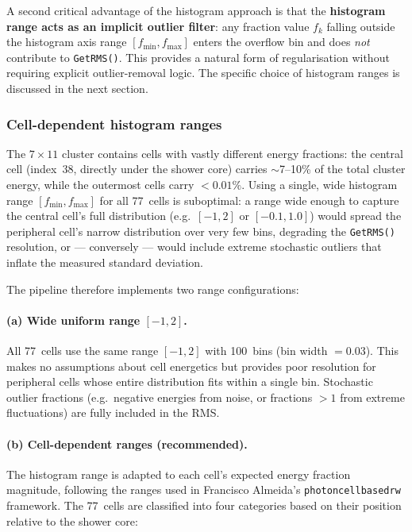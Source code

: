 \documentclass[11pt,a4paper]{article}
\begin{document}
A second critical advantage of the histogram approach is that the
\textbf{histogram range acts as an implicit outlier filter}: any fraction
value $f_k$ falling outside the histogram axis range $[f_{\min},
f_{\max}]$ enters the overflow bin and does \emph{not} contribute to
\texttt{GetRMS()}.  This provides a natural form of regularisation
without requiring explicit outlier-removal logic.  The specific choice
of histogram ranges is discussed in the next section.


\subsubsection{Cell-dependent histogram ranges}
\label{sec:m2-cellranges}

The $7 \times 11$ cluster contains cells with vastly different energy
fractions: the central cell (index~38, directly under the shower core)
carries $\sim$7--10\% of the total cluster energy, while the outermost
cells carry $< 0.01\%$.  Using a single, wide histogram range
$[f_{\min}, f_{\max}]$ for all 77~cells is suboptimal: a range wide
enough to capture the central cell's full distribution (e.g.\
$[-1, 2]$ or $[-0.1, 1.0]$) would spread the peripheral cell's
narrow distribution over very few bins, degrading the \texttt{GetRMS()}
resolution, or --- conversely --- would include extreme stochastic
outliers that inflate the measured standard deviation.

The pipeline therefore implements two range configurations:

\paragraph{(a) Wide uniform range $[-1, 2]$.}
All 77~cells use the same range $[-1, 2]$ with 100~bins (bin width $=
0.03$).  This makes no assumptions about cell energetics but provides
poor resolution for peripheral cells whose entire distribution fits
within a single bin.  Stochastic outlier fractions (e.g.\ negative
energies from noise, or fractions $> 1$ from extreme fluctuations) are
fully included in the RMS.

\paragraph{(b) Cell-dependent ranges (recommended).}
The histogram range is adapted to each cell's expected energy fraction
magnitude, following the ranges used in Francisco Almeida's
\texttt{photoncellbasedrw} framework.  The 77~cells are classified into
four categories based on their position relative to the shower core:
\end{document}

